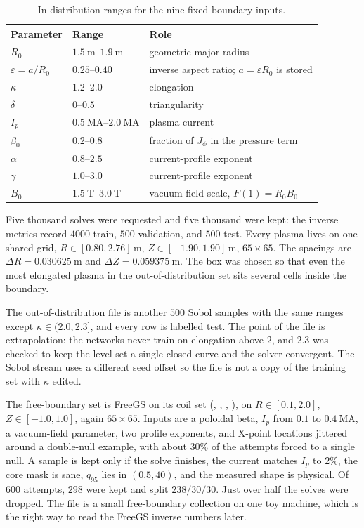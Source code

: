 \documentclass[11pt,a4paper,oneside,openany]{book}
\newcommand{\code}{\path}
\numberwithin{equation}{chapter}
\newcommand{\Ip}{I_{p}}
\theoremstyle{definition}
\begin{document}
\begin{table}[htbp]
\centering
\caption{In-distribution ranges for the nine fixed-boundary inputs.}
\label{tab:ranges}
\small
\begin{tabular}{@{}lll@{}}
\toprule
Parameter & Range & Role \\
\midrule
\(R_{0}\) & \(\qtyrange{1.5}{1.9}{\metre}\) & geometric major radius \\
\(\varepsilon=a/R_{0}\) & \(0.25\)--\(0.40\) & inverse aspect ratio; \(a=\varepsilon R_{0}\) is stored \\
\(\kappa\) & \(1.2\)--\(2.0\) & elongation \\
\(\delta\) & \(0\)--\(0.5\) & triangularity \\
\(\Ip\) & \(\qtyrange{0.5}{2.0}{\mega\ampere}\) & plasma current \\
\(\beta_{0}\) & \(0.2\)--\(0.8\) & fraction of \(J_{\phi}\) in the pressure term \\
\(\alpha\) & \(0.8\)--\(2.5\) & current-profile exponent \\
\(\gamma\) & \(1.0\)--\(3.0\) & current-profile exponent \\
\(B_{0}\) & \(\qtyrange{1.5}{3.0}{\tesla}\) & vacuum-field scale, \(F(1)=R_{0} B_{0}\) \\
\bottomrule
\end{tabular}
\end{table}

Five thousand solves were requested and five thousand were kept: the inverse metrics record \(4000\) train, \(500\) validation, and \(500\) test. Every plasma lives on one shared grid, \(R\in[0.80,2.76]\,\mathrm{m}\), \(Z\in[-1.90,1.90]\,\mathrm{m}\), \(65\times 65\). The spacings are \(\Delta R=\qty{0.030625}{\metre}\) and \(\Delta Z=\qty{0.059375}{\metre}\). The box was chosen so that even the most elongated plasma in the out-of-distribution set sits several cells inside the boundary.

The out-of-distribution file is another \(500\) Sobol samples with the same ranges except \(\kappa\in(2.0,2.3]\), and every row is labelled test. The point of the file is extrapolation: the networks never train on elongation above \(2\), and \(2.3\) was checked to keep the level set a single closed curve and the solver convergent. The Sobol stream uses a different seed offset so the file is not a copy of the training set with \(\kappa\) edited.

The free-boundary set is FreeGS on its \code{TestTokamak} coil set (\code{P1L}, \code{P1U}, \code{P2L}, \code{P2U}), on \(R\in[0.1,2.0]\), \(Z\in[-1.0,1.0]\), again \(65\times 65\). Inputs are a poloidal beta, \(\Ip\) from \(0.1\) to \(\qty{0.4}{\mega\ampere}\), a vacuum-field parameter, two profile exponents, and X-point locations jittered around a double-null example, with about \(30\%\) of the attempts forced to a single null. A sample is kept only if the solve finishes, the current matches \(\Ip\) to \(2\%\), the core mask is sane, \(q_{95}\) lies in \((0.5,40)\), and the measured shape is physical. Of \(600\) attempts, \(298\) were kept and split \(238/30/30\). Just over half the solves were dropped. The file is a small free-boundary collection on one toy machine, which is the right way to read the FreeGS inverse numbers later.
\end{document}
